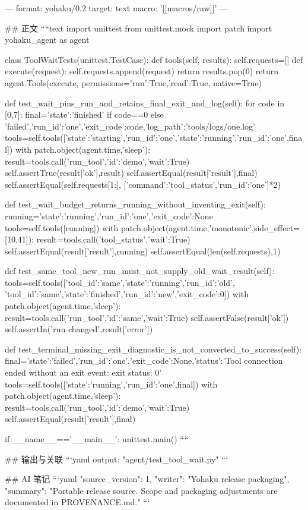 ---
format: yohaku/0.2
target: text
macro: '[[macros/raw]]'
---

## 正文
````text
import unittest
from unittest.mock import patch
import yohaku_agent as agent


class ToolWaitTests(unittest.TestCase):
    def tools(self, results):
        self.requests=[]
        def execute(request):
            self.requests.append(request)
            return results.pop(0)
        return agent.Tools(execute, permissions={'run':True,'read':True}, native=True)

    def test_wait_pins_run_and_retains_final_exit_and_log(self):
        for code in [0,7]:
            final={'state':'finished' if code==0 else 'failed','run_id':'one','exit_code':code,'log_path':'tools/logs/one.log'}
            tools=self.tools([{'state':'starting','run_id':'one'},{'state':'running','run_id':'one'},final])
            with patch.object(agent.time,'sleep'):
                result=tools.call('run_tool',{'id':'demo','wait':True})
            self.assertTrue(result['ok'],result)
            self.assertEqual(result['result'],final)
            self.assertEqual(self.requests[1:], [{'command':'tool_status','run_id':'one'}]*2)

    def test_wait_budget_returns_running_without_inventing_exit(self):
        running={'state':'running','run_id':'one','exit_code':None}
        tools=self.tools([running])
        with patch.object(agent.time,'monotonic',side_effect=[10,41]):
            result=tools.call('tool_status',{'wait':True})
        self.assertEqual(result['result'],running)
        self.assertEqual(len(self.requests),1)

    def test_same_tool_new_run_must_not_supply_old_wait_result(self):
        tools=self.tools([{'tool_id':'same','state':'running','run_id':'old'}, {'tool_id':'same','state':'finished','run_id':'new','exit_code':0}])
        with patch.object(agent.time,'sleep'):
            result=tools.call('run_tool',{'id':'same','wait':True})
        self.assertFalse(result['ok'])
        self.assertIn('run changed',result['error'])

    def test_terminal_missing_exit_diagnostic_is_not_converted_to_success(self):
        final={'state':'failed','run_id':'one','exit_code':None,'status':'Tool connection ended without an exit event: exit status: 0'}
        tools=self.tools([{'state':'running','run_id':'one'},final])
        with patch.object(agent.time,'sleep'):
            result=tools.call('run_tool',{'id':'demo','wait':True})
        self.assertEqual(result['result'],final)


if __name__=='__main__':
    unittest.main()
````

## 输出与关联
```yaml
output: "agent/test_tool_wait.py"
```

## AI 笔记
```yaml
{"source_version": 1, "writer": "Yohaku release packaging", "summary": "Portable release source. Scope and packaging adjustments are documented in PROVENANCE.md."}
```
